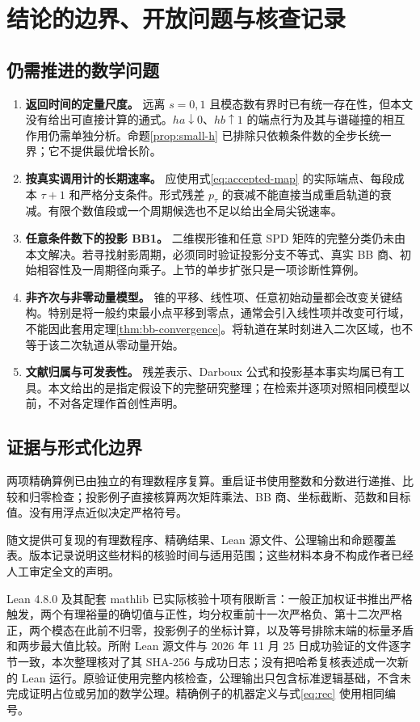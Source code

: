 \documentclass[11pt,a4paper,UTF8,fontset=fandol]{ctexart}
\theoremstyle{remark}\newtheorem{remark}[theorem]{说明}
\begin{document}
\section{结论的边界、开放问题与核查记录}
\subsection{仍需推进的数学问题}
\begin{enumerate}[label=(\arabic*)]
\item \textbf{返回时间的定量尺度。}
远离 $s=0,1$ 且模态数有界时已有统一存在性，但本文没有给出可直接计算的通式。$ha\downarrow0$、$hb\uparrow1$ 的端点行为及其与谱碰撞的相互作用仍需单独分析。命题\ref{prop:small-h} 已排除只依赖条件数的全步长统一界；它不提供最优增长阶。
\item \textbf{按真实调用计的长期速率。}
应使用式\eqref{eq:accepted-map} 的实际端点、每段成本 $\tau+1$ 和严格分支条件。形式残差 $p_\tau$ 的衰减不能直接当成重启轨道的衰减。有限个数值段或一个周期候选也不足以给出全局尖锐速率。
\item \textbf{任意条件数下的投影 BB1。}
二维楔形锥和任意 SPD 矩阵的完整分类仍未由本文解决。若寻找射影周期，必须同时验证投影分支不等式、真实 BB 商、初始相容性及一周期径向乘子。上节的单步扩张只是一项诊断性算例。
\item \textbf{非齐次与非零动量模型。}
锥的平移、线性项、任意初始动量都会改变关键结构。特别是将一般约束最小点平移到零点，通常会引入线性项并改变可行域，不能因此套用定理\ref{thm:bb-convergence}。将轨道在某时刻进入二次区域，也不等于该二次轨道从零动量开始。
\item \textbf{文献归属与可发表性。}
残差表示、Darboux 公式和投影基本事实均属已有工具。本文给出的是指定假设下的完整研究整理；在检索并逐项对照相同模型以前，不对各定理作首创性声明。
\end{enumerate}

\subsection{证据与形式化边界}
两项精确算例已由独立的有理数程序复算。重启证书使用整数和分数进行递推、比较和归零检查；投影例子直接核算两次矩阵乘法、BB 商、坐标截断、范数和目标值。没有用浮点近似决定严格符号。

随文提供可复现的有理数程序、精确结果、Lean 源文件、公理输出和命题覆盖表。版本记录说明这些材料的核验时间与适用范围；这些材料本身不构成作者已经人工审定全文的声明。

Lean 4.8.0 及其配套 mathlib 已实际核验十项有限断言：一般正加权证书推出严格触发，两个有理裕量的确切值与正性，均分权重前十一次严格负、第十二次严格正，两个模态在此前不归零，投影例子的坐标计算，以及等号排除末端的标量矛盾和两步最大值比较。所附 Lean 源文件与 2026 年 11 月 25 日成功验证的文件逐字节一致，本次整理核对了其 SHA-256 与成功日志；没有把哈希复核表述成一次新的 Lean 运行。原验证使用完整内核检查，公理输出只包含标准逻辑基础，不含未完成证明占位或另加的数学公理。精确例子的机器定义与式\eqref{eq:rec} 使用相同编号。
\end{document}
